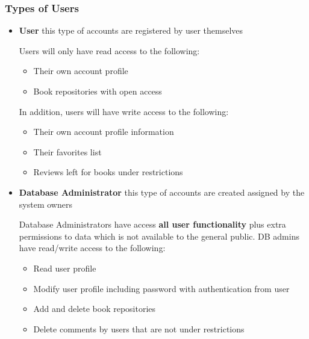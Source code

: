 \documentclass[letter, 12pt, titlepage]{article}
\begin{document}
			\subsubsection{Types of Users}
				\begin{itemize} 
					\item \textbf{User}		
						this type of accounts are registered by user themselves 


						Users will only have read access to the following:
						\begin{itemize}
							\item  Their own account profile
							\item  Book repositories with open access
						\end{itemize}


					 In addition, users will have write access to the following:
						\begin{itemize}
							\item  Their own account profile information
							\item  Their favorites list
							\item  Reviews left for books under restrictions
						\end{itemize}

					\item \textbf{Database Administrator}
						this type of accounts are created assigned by the system owners


						Database Administrators have access \textbf{all user functionality} plus extra permissions to data which is not available to the general public. DB admins have read/write access to the following: 			
						\begin{itemize}
							\item Read user profile
							\item Modify user profile including password with authentication from user
							\item Add and delete book repositories
							\item Delete comments by users that are not under restrictions
		  			\end{itemize}
				\end{itemize}
\end{document}
